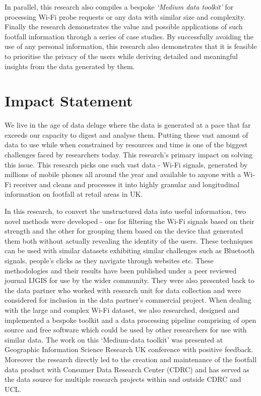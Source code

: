 In parallel, this research also compiles a bespoke \textit{`Medium data toolkit'} for processing Wi-Fi probe requests or any data with similar size and complexity.
Finally the research demonstrates the value and possible applications of such footfall information through a series of case studies.
By successfully avoiding the use of any personal information, this research also demonstrates that it is feasible to prioritise the privacy of the users while deriving detailed and meaningful insights from the data generated by them.

\section*{Impact Statement}

We live in the age of data deluge where the data is generated at a pace that far exceeds our capacity to digest and analyse them.
Putting these vast amount of data to use while when constrained by resources and time is one of the biggest challenges faced by researchers today.
This research's primary impact on solving this issue.
This research picks one such vast data - Wi-Fi signals, generated by millions of mobile phones all around the year and available to anyone with a Wi-Fi receiver and cleans and processes it into highly granular and longitudinal information on footfall at retail areas in UK.

In this research, to convert the unstructured data into useful information, two novel methods were developed - one for filtering the Wi-Fi signals based on their strength and the other for grouping them based on the device that generated them both without actually revealing the identity of the users.
These techniques can be used with similar datasets exhibiting similar challenges such as Bluetooth signals, people's clicks as they navigate through websites etc.
These methodologies and their results have been published under a peer reviewed journal IJGIS for use by the wider community.
They were also presented back to the data partner who worked with research unit for data collection and were considered for inclusion in the data partner's commercial project.
When dealing with the large and complex Wi-Fi dataset, we also researched, designed and implemented a bespoke toolkit and a data processing pipeline comprising of open source and free software which could be used by other researchers for use with similar data.
The work on this `Medium-data toolkit' was presented at Geographic Information Science Research UK conference with positive feedback.
Moreover the research directly led to the creation and maintenance of the footfall data product with Consumer Data Research Center (CDRC) and has served as the data source for multiple research projects within and outside CDRC and UCL.

